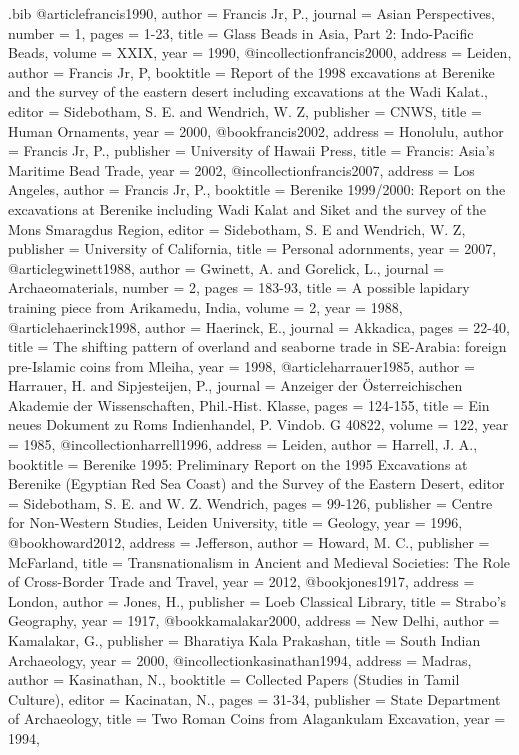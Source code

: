 \begin{filecontents}{\IJSRAidentifier.bib}
@article{francis1990,
	author = {Francis Jr, P.},
	journal = {Asian Perspectives},
	number = {1},
	pages = {1-23},
	title = {Glass Beads in Asia, Part 2: Indo-Pacific Beads},
	volume = {XXIX},
	year = {1990},
}
@incollection{francis2000,
	address = {Leiden},
	author = {Francis Jr, P},
	booktitle = {Report of the 1998 excavations at Berenike and the survey of the eastern desert including excavations at the Wadi Kalat.},
	editor = {Sidebotham, S. E. and Wendrich, W. Z},
	publisher = {CNWS},
	title = {Human Ornaments},
	year = {2000},
}
@book{francis2002,
	address = {Honolulu},
	author = {Francis Jr, P.},
	publisher = {University of Hawaii Press},
	title = {Francis: Asia's Maritime Bead Trade},
	year = {2002},
}
@incollection{francis2007,
	address = {Los Angeles},
	author = {Francis Jr, P.},
	booktitle = {Berenike 1999/2000: Report on the excavations at Berenike including Wadi Kalat and Siket and the survey of the Mons Smaragdus Region},
	editor = {Sidebotham, S. E and Wendrich, W. Z},
	publisher = {University of California},
	title = {Personal adornments},
	year = {2007},
}
@article{gwinett1988,
	author = {Gwinett, A. and Gorelick, L.},
	journal = {Archaeomaterials},
	number = {2},
	pages = {183-93},
	title = {A possible lapidary training piece from Arikamedu, India},
	volume = {2},
	year = {1988},
}
@article{haerinck1998,
	author = {Haerinck, E.},
	journal = {Akkadica},
	pages = {22-40},
	title = {The shifting pattern of overland and seaborne trade in SE-Arabia: foreign pre-Islamic coins from Mleiha},
	year = {1998},
}
@article{harrauer1985,
	author = {Harrauer, H. and Sipjesteijen, P.},
	journal = {Anzeiger der Österreichischen Akademie der Wissenschaften, Phil.-Hist. Klasse},
	pages = {124-155},
	title = {Ein neues Dokument zu Roms Indienhandel, P. Vindob. G 40822},
	volume = {122},
	year = {1985},
}
@incollection{harrell1996,
	address = {Leiden},
	author = {Harrell, J. A.},
	booktitle = {Berenike 1995: Preliminary Report on the 1995 Excavations at Berenike (Egyptian Red Sea Coast) and the Survey of the Eastern Desert},
	editor = {Sidebotham, S. E. and W. Z. Wendrich},
	pages = {99-126},
	publisher = {Centre for Non-Western Studies, Leiden University},
	title = {Geology},
	year = {1996},
}
@book{howard2012,
	address = {Jefferson},
	author = {Howard, M. C.},
	publisher = {McFarland},
	title = {Transnationalism in Ancient and Medieval Societies: The Role of Cross-Border Trade and Travel},
	year = {2012},
}
@book{jones1917,
	address = {London},
	author = {Jones, H.},
	publisher = {Loeb Classical Library},
	title = {Strabo's Geography},
	year = {1917},
}
@book{kamalakar2000,
	address = {New Delhi},
	author = {Kamalakar, G.},
	publisher = {Bharatiya Kala Prakashan},
	title = {South Indian Archaeology},
	year = {2000},
}
@incollection{kasinathan1994,
	address = {Madras},
	author = {Kasinathan, N.},
	booktitle = {Collected Papers (Studies in Tamil Culture)},
	editor = {Kacinatan, N.},
	pages = {31-34},
	publisher = {State Department of Archaeology},
	title = {Two Roman Coins from Alagankulam Excavation},
	year = {1994},
}


\end{filecontents}
